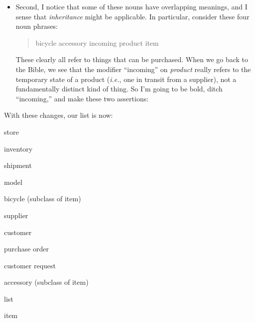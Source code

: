 \begin{itemize}
\item Second, I notice that some of these nouns have overlapping meanings, and
I sense that \textit{inheritance} might be applicable. In particular, consider
these four noun phrases:

\begin{quote}
\begin{center}
\textsf{bicycle \quad \quad \quad accessory \quad \quad \quad incoming product
\quad \quad \quad
item}
\end{center}
\end{quote}

These clearly all refer to things that can be purchased. When we go back to
the Bible, we see that the modifier ``incoming'' on \textit{product} really
refers to the temporary state of a product (\textit{i.e.}, one in transit from
a supplier), not a fundamentally distinct kind of thing. So I'm going to be
bold, ditch ``incoming,'' and make these two assertions:


\end{itemize}

With these changes, our list is now:
\vspace{-.2in}
\begin{samepage}
\begin{center}
\parbox{.9\textwidth}{
\begin{multicols}{2}
\begin{compactitem}
\item \textsf{store}
\item \textsf{inventory}
\item \textsf{shipment}
\item \textsf{model}
\item \textsf{bicycle} (subclass of \textsf{item})
\item \textsf{supplier}
\columnbreak
\item \textsf{customer}
\item \textsf{purchase order}
\item \textsf{customer request}
\item \textsf{accessory} (subclass of \textsf{item})
\item \textsf{list}
\item \textsf{item}
\end{compactitem}
\end{multicols}
}
\end{center}
\end{samepage}

